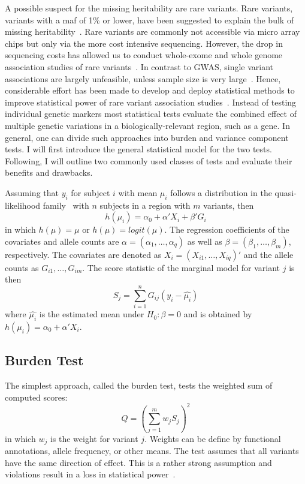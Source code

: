 A possible suspect for the missing heritability are rare variants.
Rare variants,  variants with a \acrfull{maf} of 1\% or lower, have been suggested to explain the bulk of missing heritability~\cite{Jiang2013,Li2009a}.
Rare variants are commonly not accessible via micro array chips but only via the more cost intensive sequencing.
However, the drop in sequencing costs has allowed us to conduct whole-exome and whole genome association studies of rare variants~\cite{Goodwin2016}.
In contrast to GWAS, single variant associations are largely unfeasible, unless sample size is very large~\cite{Lee2014}.
Hence, considerable effort has been made to develop and deploy statistical methods to improve statistical power of rare variant association studies~\cite{Morris2010,Zeng2014,Daye2012,Manuscript2013}.
Instead of testing individual genetic markers most statistical tests evaluate the combined effect of multiple genetic variations in a biologically-relevant region, such as a gene.
In general, one can divide such approaches into burden and variance component tests.
I will first introduce the general statistical model for the two tests.
Following, I will outline two commonly used classes of tests and evaluate their benefits and drawbacks.

Assuming that $y_i$ for subject $i$ with mean $\mu_i$ follows a distribution in the quasi-likelihood family~\cite{Lee2014} with $n$ subjects in a region with $m$ variants, then
\begin{equation}
  h(\mu_i) = \alpha_0 + \alpha'X_i +\beta'G_i
\end{equation}
in which $h(\mu) = \mu$ or $h(\mu) = logit(\mu)$.
The regression coefficients of the covariates and allele counts are $\alpha = (\alpha_1, \ldots, \alpha_q)$ as well as $\beta = (\beta_1, \ldots, \beta_m)$, respectively.
The covariates are denoted as $X_i = (X_{i1}, \ldots, X_{iq})'$ and the allele counts as $G_{i1}, \ldots, G_{im}$.
The score statistic of the marginal model for variant $j$ is then
\begin{equation}
  S_j = \sum^n_{i=1} G_{ij}(y_i-\hat{\mu_i})
\end{equation}
where $\hat{\mu_i}$ is the estimated mean under $H_0: \beta = 0 $ and is obtained by $h(\mu_i) = \alpha_0 + \alpha'X_i$.

\subsection{Burden Test}
\label{sub:burden_test}
The simplest approach, called the burden test, tests the weighted sum of computed scores:
\begin{equation}\label{eq:burden}
  Q = {(\sum^{m}_{j=1} w_{j} S_{j})}^2
\end{equation}
in which $w_j$ is the weight for variant $j$.
Weights can be define by functional annotations, allele frequency, or other means.
The test assumes that all variants  have the same direction of effect.
This is a rather strong assumption and violations result in a loss in statistical power~\cite{Derkach2013a}.

